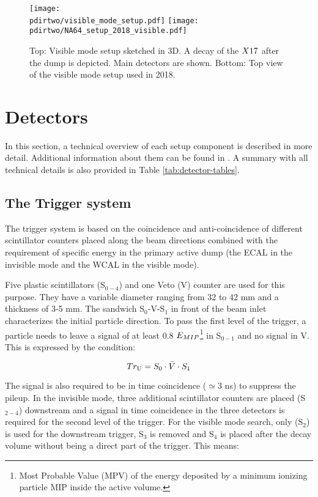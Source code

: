 \begin{figure}[tb]
  \centering
  \texttt{[image: \\pdirtwo/visible\_mode\_setup.pdf]}  
  \texttt{[image: \\pdirtwo/NA64\_setup\_2018\_visible.pdf]}
  \caption[NA64 visible mode setup 2018]{Top: Visible mode setup sketched in 3D. A decay of the $X17$ after the dump is depicted. Main detectors are shown. Bottom: Top view of the visible mode setup used in 2018.}
  \label{fig:setup-vis-2018}
\end{figure}

\section{Detectors}
\label{ch2:sec:detectors}

In this section, a technical overview of each setup component is described in more detail. Additional information about them can be found in \cite{ABBON201569}. A summary with all technical details is also provided in Table \ref{tab:detector-tables}.

\subsection{The Trigger system}
\label{ch2:sec:detectors-trigger}

The trigger system is based on the coincidence and anti-coincidence of different scintillator counters placed along the beam directions combined with the requirement of specific energy in the primary active dump (the ECAL in the invisible mode and the WCAL in the visible mode).

Five plastic scintillators (S$_{0-4}$) and one Veto (V) counter are used for this purpose. They have a variable diameter ranging from 32 to 42 \si{mm} and a thickness of 3-5 \si{mm}. The sandwich S$_0$-V-S$_1$ in front of the beam inlet characterizes the initial particle direction. To pass the first level of the trigger, a particle needs to leave a signal of at least 0.8 $E_{MIP}$\footnote{Most Probable Value (MPV) of the energy deposited by a minimum ionizing particle MIP inside the active volume.} in S$_{0-1}$ and no signal in V. This is expressed by the condition:

\begin{equation}
\label{eq:trigger-upstream}
Tr_{\rm{U}} = S_0 \cdot \bar{V} \cdot S_1
\end{equation}

The signal is also required to be in time coincidence ($\simeq$3 \si{ns}) to suppress the pileup. In the invisible mode, three additional scintillator counters are placed (S$_{2-4}$) downstream and a signal in time coincidence in the three detectors is required for the second level of the trigger. For the visible mode search, only (S$_2$) is used for the downstream trigger, S$_3$ is removed and S$_4$ is placed after the decay volume without being a direct part of the trigger. This means:

